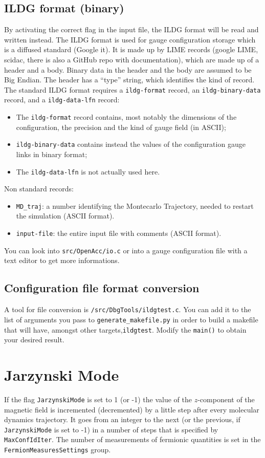\subsection{ILDG format (binary)}
By activating the correct flag in the input file, the ILDG format will be read 
and written instead. The ILDG format is used for gauge configuration 
storage which is a diffused standard (Google it). It is made up by LIME records 
(google LIME, scidac, there is also a GitHub repo with documentation), which 
are made up of a header and a body. Binary data in the header and the body are 
assumed to be Big Endian. The header has a ``type'' string, which identifies 
the 
kind of record.
The standard ILDG format requires a \texttt{ildg-format} record, an 
\texttt{ildg-binary-data} record, and a \texttt{ildg-data-lfn} record:
\begin{itemize}
    \item The \texttt{ildg-format} record contains, most notably the dimensions of 
        the configuration, the precision and the kind of gauge field (in ASCII);
    \item \texttt{ildg-binary-data} contains instead the values of the 
        configuration gauge links in binary format;
    \item The \texttt{ildg-data-lfn} is not actually used here.
\end{itemize}
Non standard records:
\begin{itemize}
    \item \verb|MD_traj|: a number identifying the Montecarlo Trajectory, needed 
        to restart the simulation (ASCII format).
    \item \verb|input-file|: the entire input file with comments (ASCII format).
\end{itemize}
You can look into \verb|src/OpenAcc/io.c| or into a gauge configuration 
file with a text editor to get more informations.

\subsection{Configuration file format conversion}
A tool for file conversion is \verb|/src/DbgTools/ildgtest.c|. You can add it 
to the list of arguments you pass to \verb|generate_makefile.py| in order to 
build a makefile that will have, amongst other targets,\verb|ildgtest|.
Modify the \verb|main()| to obtain your desired result.

\section{Jarzynski Mode}
\label{JarzynskiMode}

If the flag \verb|JarzynskiMode| is set to 1 (or -1) the value of the $z$-component of the magnetic field is incremented (decremented)
by a little step after every molecular dynamics trajectory. It goes from an integer to the next (or the previous, if \verb|JarzynskiMode| is set to -1)
in a number of steps that is specified by \verb|MaxConfIdIter|. 
The number of measurements of fermionic quantities is set in the \verb|FermionMeasuresSettings| group.

